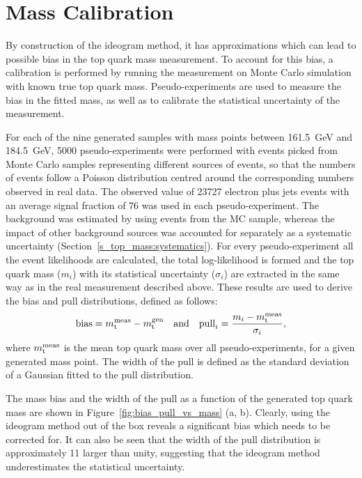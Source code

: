 \newpage
\section{Mass Calibration}
\label{s_top_mass:calibration}

By construction of the ideogram method, it has approximations which can lead to possible bias in the top quark mass
measurement. To account for this bias, a calibration is performed by running the measurement on Monte Carlo simulation
with known true top quark mass. Pseudo-experiments are used to measure the bias in the fitted mass, as well as to
calibrate the statistical uncertainty of the measurement.

For each of the nine generated \ttbar samples with mass points between \SI{161.5}{\GeV} and \SI{184.5}{\GeV},
\num{5000} pseudo-experiments were performed with events picked from Monte Carlo samples representing different sources
of events, so that the numbers of events follow a Poisson distribution centred around the corresponding numbers observed
in real data. The observed value of \num{23727} electron plus jets events with an average signal fraction of
\SI{76}{\pc} was used in each pseudo-experiment. The background was estimated by using events from the \WpJets MC
sample, whereas the impact of other background sources was accounted for separately as a systematic uncertainty
(Section~\ref{s_top_mass:systematics}). For every pseudo-experiment all the event likelihoods are calculated, the total
log-likelihood is formed and the top quark mass ($m_i$) with its statistical uncertainty ($\sigma_i$) are extracted in
the same way as in the real measurement described above. These results are used to derive the bias and pull
distributions, defined as follows:
\begin{equation}
 \textrm{bias} = m_\mathrm{t}^{\rm meas} - m_\mathrm{t}^{\rm gen} \quad \text{and} \quad
 \textrm{pull}_i = \frac{m_i - m_\mathrm{t}^{\rm meas}}{\sigma_i},
\label{eq:bias_pull}
\end{equation}
where $m_\mathrm{t}^{\rm meas}$ is the mean top quark mass over all pseudo-experiments, for a given generated mass point. The
width of the pull is defined as the standard deviation of a Gaussian fitted to the pull distribution.

The mass bias and the width of the pull as a function of the generated top quark mass are shown in
Figure~\ref{fig:bias_pull_vs_mass} (a, b). Clearly, using the ideogram method out of the box reveals a significant bias
which needs to be corrected for. It can also be seen that the width of the pull distribution is approximately
\SI{11}{\pc} larger than unity, suggesting that the ideogram method underestimates the statistical uncertainty.

